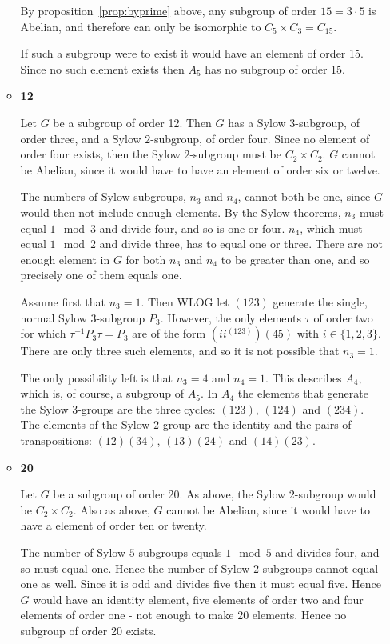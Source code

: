 \documentclass[11pt]{article} \usepackage{amssymb}
\begin{document}
\begin{enumerate}
\begin{itemize}
      By proposition~\ref{prop:byprime} above, any subgroup of order $15=3\cdot 5$
      is Abelian, and therefore can only be isomorphic to 
      $C_5\times C_3=C_{15}$. 

      If such a subgroup were to exist it would have an element of order 15. 
      Since no such element exists then $A_5$ has no subgroup of order 15.

    \item {\bf 12}
      
      Let $G$ be a subgroup of order 12. Then $G$ has a Sylow $3$-subgroup,
      of order three, and a Sylow $2$-subgroup, of order four. Since no 
      element of order four exists, then the Sylow $2$-subgroup must be 
      $C_2\times C_2$. $G$ cannot be Abelian, since it would have to have 
      an element of order six or twelve.

      The numbers of Sylow subgroups, $n_3$ and $n_4$, cannot both
      be one, since $G$ would then not include enough elements. 
      By the Sylow theorems, $n_3$ must equal $1\mod 3$ and divide
      four, and so is one or four. $n_4$, which must equal $1\mod 2$ and divide
      three, has to equal one or three. There are not enough element in $G$
      for both $n_3$ and $n_4$ to be greater than one, and so precisely one
      of them equals one.

      Assume first that $n_3=1$. Then WLOG let $(123)$ generate the single,
      normal Sylow $3$-subgroup $P_3$. However, the only elements $\tau$ of
      order two for which $\tau^{-1}P_3\tau=P_3$ are of the form $(ii^{(123)})(45)$ with
      $i\in\{1,2,3\}$. There are only three such elements, and so it is not
      possible that $n_3=1$.

      The only possibility left is that $n_3=4$ and $n_4=1$. This describes
      $A_4$, which is, of course, a subgroup of $A_5$. In $A_4$ the elements that
      generate the Sylow $3$-groups are the three cycles: $(123)$, $(124)$ and 
      $(234)$. The elements of the Sylow $2$-group are the identity and the 
      pairs of transpositions: $(12)(34)$, $(13)(24)$ and $(14)(23)$. 
      
    \item {\bf 20}

      Let $G$ be a subgroup of order 20.
      As above, the Sylow $2$-subgroup would
      be $C_2\times C_2$. 
      Also as above, $G$  cannot be Abelian, since it would have
      to have a element of order ten or twenty.

      The number of Sylow $5$-subgroups equals $1\mod 5$ and divides four,
      and so must equal one. Hence the number of Sylow $2$-subgroups cannot
      equal one as well. Since it is odd and divides five then it must equal
      five. Hence $G$ would have an identity element, five elements of order 
      two and four elements of order one - not enough to make 20 elements.
      Hence no subgroup of order 20 exists.


\end{itemize}
\end{enumerate}
\end{document}
